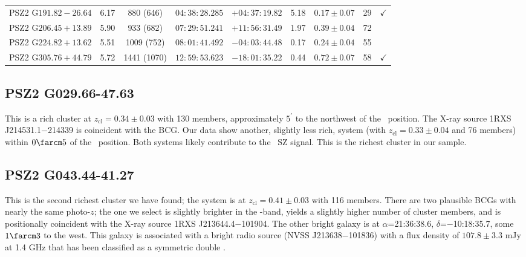 \documentclass[apj, revtex4-1]{emulateapj}
\begin{document}
\begin{table}
\begin{tabular}{lcccccccc}
	 PSZ2 G$191.82-26.64$ & 6.17 & 880 (646) & $04:38:28.285$ &  $+04:37:19.82$ & 5.18 & $0.17 \pm 0.07$ & 29 & $\checkmark$ \\
	 PSZ2 G$206.45+13.89$ & 5.90 & 933 (682) & $07:29:51.241$ &  $+11:56:31.49$ & 1.97 & $0.39 \pm 0.04$ & 72 & \\
	 PSZ2 G$224.82+13.62$ & 5.51 & 1009 (752) & $08:01:41.492$ &  $-04:03:44.48$ & 0.17 & $0.24 \pm 0.04$ & 55 & \\
	 PSZ2 G$305.76+44.79$ & 5.72 & 1441 (1070) & $12:59:53.623$ &  $-18:01:35.22$ & 0.44 & $0.72 \pm 0.07$ & 58 & $\checkmark$ \\
	\hline
	\end{tabular}
\label{tbl:results}
\end{table}

\subsection{PSZ2 G029.66-47.63} %
This is a rich cluster at $z_\mathrm{cl} = 0.34 \pm 0.03$ with 130 members, approximately $5^\prime$ to the northwest of the \planck\ position. The X-ray source 1RXS J214531.1$-$214339 is coincident with the BCG. Our data show another, slightly less rich, system (with $z_\mathrm{cl} = 0.33 \pm 0.04$ and 76 members) within $0\farcm5$ of the \planck\ position. Both systems likely contribute to the \planck\ SZ signal. This is the richest cluster in our sample.

\subsection{PSZ2 G043.44-41.27} %
This is the second richest cluster we have found; the system is at $z_\mathrm{cl} = 0.41 \pm 0.03$ with 116 members. There are two plausible BCGs with nearly the same photo-$z$; the one we select is slightly brighter in the \sdssi-band, yields a slightly higher number of cluster members, and is positionally coincident with the X-ray source 1RXS J213644.4$-$101904. The other bright galaxy is at $\alpha$=21:36:38.6, $\delta$=$-$10:18:35.7, some $1\farcm3$ to the west. This galaxy is associated with a bright radio source (NVSS J213638$-$101836) with a flux density of $107.8 \pm 3.3$ mJy at 1.4 GHz that has been classified as a symmetric double \citep{Douglas1996}.
\end{document}

